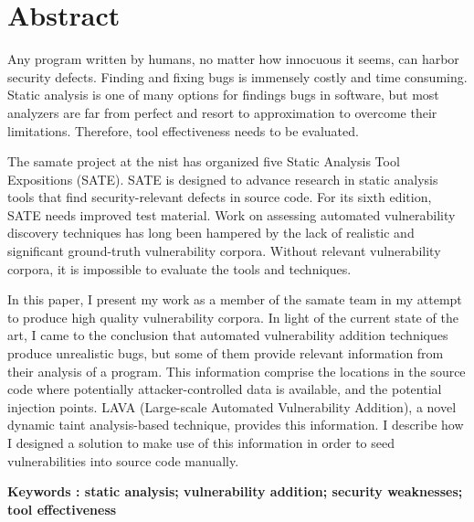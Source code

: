 {}
\section*{Abstract}



\begin{small}
    Any program written by humans, no matter how innocuous it seems, can harbor security defects. Finding and fixing bugs is immensely costly and time consuming. Static analysis is one of many options for findings bugs in software, but most analyzers are far from perfect and resort to approximation to overcome their limitations. Therefore, tool effectiveness needs to be evaluated.
    
    The \acrfull{samate} project at the \acrfull{nist} has organized five Static Analysis Tool Expositions (SATE). SATE is designed to advance research in static analysis tools that find security-relevant defects in source code. For its sixth edition, SATE needs improved test material. Work on assessing automated vulnerability discovery techniques has long been hampered by the lack of realistic and significant ground-truth vulnerability corpora. Without relevant vulnerability corpora, it is impossible to evaluate the tools and techniques.
    
    In this paper, I present my work as a member of the \gls{samate} team in my attempt to produce high quality vulnerability corpora. In light of the current state of the art, I came to the conclusion that automated vulnerability addition techniques produce unrealistic bugs, but some of them provide relevant information from their analysis of a program. This information comprise the locations in the source code where potentially attacker-controlled data is available, and the potential injection points. LAVA (Large-scale Automated Vulnerability Addition), a novel dynamic taint analysis-based technique, provides this information. I describe how I designed a solution to make use of this information in order to seed vulnerabilities into source code manually.
    
    {\bf Keywords : static analysis; vulnerability addition; security weaknesses; tool effectiveness}
\end{small}
